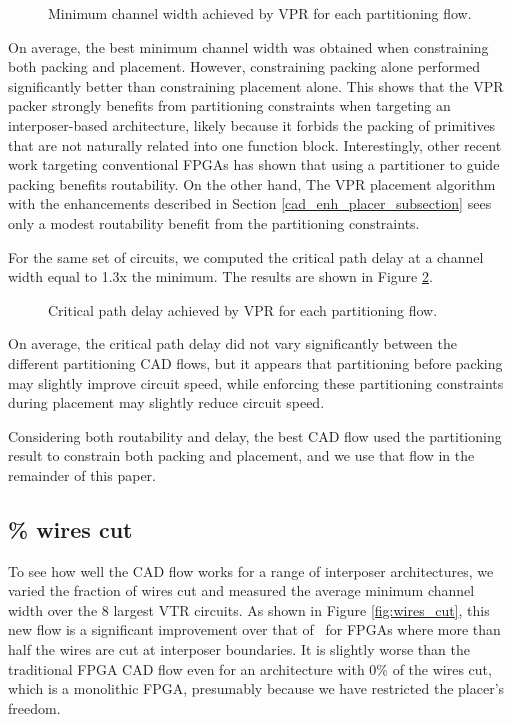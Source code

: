\begin{figure}[!htbp]
\centering

\caption{Minimum channel width achieved by VPR for each partitioning flow.}
\label{fig:flows_mcw}
\end{figure}

On average, the best minimum channel width was obtained when constraining both packing and placement. However, constraining packing alone performed significantly better than constraining placement alone. This shows that the VPR packer strongly benefits from partitioning constraints when targeting an interposer-based architecture, likely because it forbids the packing of primitives that are not naturally related into one function block. Interestingly, other recent work targeting conventional FPGAs has shown that using a partitioner to guide packing benefits routability\cite{feng2014rent}. On the other hand, The VPR placement algorithm with the enhancements described in Section \ref{cad_enh_placer_subsection} sees only a modest routability benefit from the partitioning constraints.

For the same set of circuits, we computed the critical path delay at a channel width equal to 1.3x the minimum. The results are shown in Figure \ref{fig:flows_crit_path}.

\begin{figure}[!htbp]
\centering

\caption{Critical path delay achieved by VPR for each partitioning flow.}
\label{fig:flows_crit_path}
\end{figure}

On average, the critical path delay did not vary significantly between the different partitioning CAD flows, but it appears that partitioning before packing may slightly improve circuit speed, while enforcing these partitioning constraints during placement may slightly reduce circuit speed.

Considering both routability and delay, the best CAD flow used the partitioning result to constrain both packing and placement, and we use that flow in the remainder of this paper.

\subsection{\% wires cut}
To see how well the CAD flow works for a range of interposer architectures, we varied the fraction of wires cut and measured the average minimum channel width over the 8 largest VTR circuits. As shown in Figure \ref{fig:wires_cut}, this new flow is a significant improvement over that of~\cite{interposer2014} for FPGAs where more than half the wires are cut at interposer boundaries. It is slightly worse than the traditional FPGA CAD flow even for an architecture with 0\% of the wires cut, which is a monolithic FPGA, presumably because we have restricted the placer's freedom.

